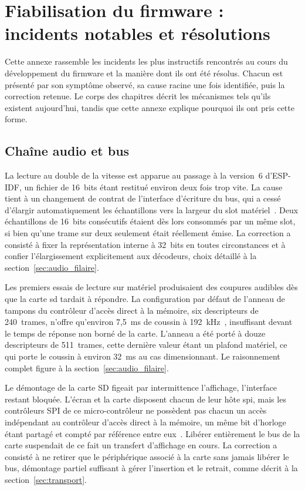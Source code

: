 \chapter{Fiabilisation du firmware : incidents notables et résolutions}
\label{annexe:fiabilisation}

Cette annexe rassemble les incidents les plus instructifs rencontrés au cours du développement du firmware et la manière dont ils ont été résolus. Chacun est présenté par son symptôme observé, sa cause racine une fois identifiée, puis la correction retenue. Le corps des chapitres décrit les mécanismes tels qu'ils existent aujourd'hui, tandis que cette annexe explique pourquoi ils ont pris cette forme.

\section{Chaîne audio et bus}

La lecture au double de la vitesse est apparue au passage à la version~6 d'ESP-IDF, un fichier de 16~bits étant restitué environ deux fois trop vite. La cause tient à un changement de contrat de l'interface d'écriture du bus, qui a cessé d'élargir automatiquement les échantillons vers la largeur du \gls{slot} matériel~\cite{ESP32_IDF_migration_v6}. Deux échantillons de 16~bits consécutifs étaient dès lors consommés par un même slot, si bien qu'une trame sur deux seulement était réellement émise. La correction a consisté à fixer la représentation interne à 32~bits en toutes circonstances et à confier l'élargissement explicitement aux décodeurs, choix détaillé à la section~\ref{sec:audio_filaire}.

Les premiers essais de lecture sur matériel produisaient des coupures audibles dès que la carte \gls{sd} tardait à répondre. La configuration par défaut de l'anneau de tampons du contrôleur d'accès direct à la mémoire, six descripteurs de 240~trames, n'offre qu'environ 7,5~ms de coussin à 192~kHz~\cite{ESP32_IDF_i2s}, insuffisant devant le temps de réponse non borné de la carte. L'anneau a été porté à douze descripteurs de 511~trames, cette dernière valeur étant un plafond matériel, ce qui porte le coussin à environ 32~ms au cas dimensionnant. Le raisonnement complet figure à la section~\ref{sec:audio_filaire}.

Le démontage de la carte SD figeait par intermittence l'affichage, l'interface restant bloquée. L'écran et la carte disposent chacun de leur hôte \gls{spi}, mais les contrôleurs SPI de ce micro-contrôleur ne possèdent pas chacun un accès indépendant au contrôleur d'accès direct à la mémoire, un même bit d'horloge étant partagé et compté par référence entre eux~\cite{ESP32_Technical_Reference_Manual}. Libérer entièrement le bus de la carte suspendait de ce fait un transfert d'affichage en cours. La correction a consisté à ne retirer que le périphérique associé à la carte sans jamais libérer le bus, démontage partiel suffisant à gérer l'insertion et le retrait, comme décrit à la section~\ref{sec:transport}.

